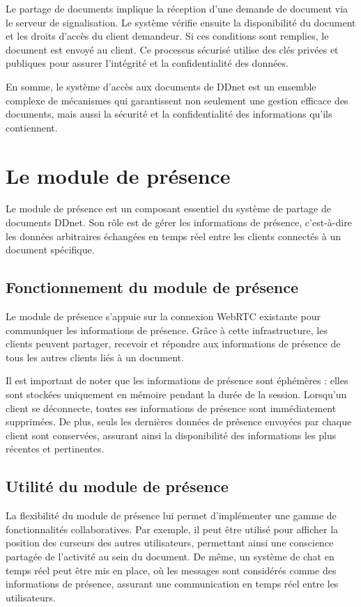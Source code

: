 Le partage de documents implique la réception d'une demande de document via le serveur de signalisation. Le système vérifie ensuite la disponibilité du document et les droits d'accès du client demandeur. Si ces conditions sont remplies, le document est envoyé au client. Ce processus sécurisé utilise des clés privées et publiques pour assurer l'intégrité et la confidentialité des données.

En somme, le système d'accès aux documents de DDnet est un ensemble complexe de mécanismes qui garantissent non seulement une gestion efficace des documents, mais aussi la sécurité et la confidentialité des informations qu'ils contiennent.

\section{Le module de présence}
Le module de présence est un composant essentiel du système de partage de documents DDnet. Son rôle est de gérer les informations de présence, c'est-à-dire les données arbitraires échangées en temps réel entre les clients connectés à un document spécifique.

\subsection{Fonctionnement du module de présence}
Le module de présence s'appuie sur la connexion WebRTC existante pour communiquer les informations de présence. Grâce à cette infrastructure, les clients peuvent partager, recevoir et répondre aux informations de présence de tous les autres clients liés à un document.

Il est important de noter que les informations de présence sont éphémères : elles sont stockées uniquement en mémoire pendant la durée de la session. Lorsqu'un client se déconnecte, toutes ses informations de présence sont immédiatement supprimées. De plus, seuls les dernières données de présence envoyées par chaque client sont conservées, assurant ainsi la disponibilité des informations les plus récentes et pertinentes.

\subsection{Utilité du module de présence}
La flexibilité du module de présence lui permet d'implémenter une gamme de fonctionnalités collaboratives. Par exemple, il peut être utilisé pour afficher la position des curseurs des autres utilisateurs, permettant ainsi une conscience partagée de l'activité au sein du document. De même, un système de chat en temps réel peut être mis en place, où les messages sont considérés comme des informations de présence, assurant une communication en temps réel entre les utilisateurs.